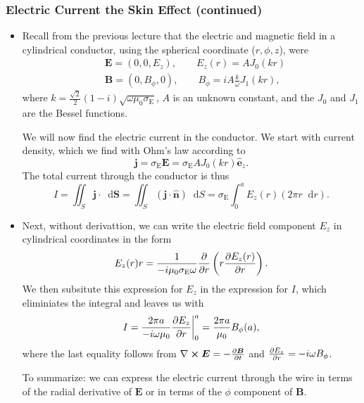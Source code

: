 \documentclass[11pt, a4paper]{article}
\newcommand{\diff}{\mathop{}\!\mathrm{d}} %
\renewcommand{\vec}[1]{\bm{#1}} %
\newcommand{\uvec}[1]{\hat{\vec{#1}}} %
\newcommand{\E}{\vec{E}} %
\newcommand{\B}{\vec{B}} %
\newcommand{\mm}{\mu_{0}}  %
\renewcommand{\j}{\vec{j}}  %
\renewcommand{\curl}{\nabla \cross}
\begin{document}
\subsubsection{Electric Current the Skin Effect (continued)}
\begin{itemize}
	\item Recall from the previous lecture that the electric and magnetic field in a cylindrical conductor, using the spherical coordinate ($ r, \phi, z $), were
	\begin{align*}
		& \E = (0, 0, E_{z}), \qquad E_{z}(r) = A J_{0}(kr) \\
		& \B = (0, B_{\phi}, 0), \qquad B_{\phi} = i A \frac{k}{\omega} J_{1}(kr),
	\end{align*}
	where $ k = \frac{\sqrt{2}}{2}(1- i)\sqrt{\omega \mm \sigma_{\text{E}}} $, $ A $ is an unknown constant, and the $ J_{0} $ and $ J_{1} $ are the Bessel functions.
	
	We will now find the electric current in the conductor. We start with current density, which we find with Ohm's law according to
	\begin{equation*}
		\j = \sigma_{\text{E}}\E = \sigma_{\text{E}}AJ_{0}(kr)\uvec{e}_{z}.
	\end{equation*}
	The total current through the conductor is thus
	\begin{equation*}
		I = \iint_{S} \j \cdot \diff \vec{S} = \iint_{S} (\j \cdot \uvec{n})\diff S = \sigma_{\text{E}} \int_{0}^{a}E_{z}(r)(2\pi r\diff r).
	\end{equation*}
	
	\item Next, without derivattion, we can write the electric field component $ E_{z} $ in cylindrical coordinates in the form
	\begin{equation*}
		E_{z}(r)r = \frac{1}{-i\mm \sigma_{\text{E}}\omega} \pdv{r}\left(r \pdv{E_{z}(r)}{r}\right).
	\end{equation*}
	We then subsitute this expression for $ E_{z} $ in the expression for $ I $, which eliminiates the integral and leaves us with
	\begin{equation*}
		I = \frac{2\pi a}{-i\omega \mm}\pdv{E_{z}}{r}\bigg |_{0}^{a} = \frac{2\pi a}{\mm}B_{\phi}(a),
	\end{equation*}
	where the last equality follows from $ \curl \E = - \pdv{\B}{t} $ and $ \pdv{E_{z}}{r} = -i \omega B_{\phi}$.
	
	To summarize: we can express the electric current through the wire in terms of the radial derivative of $ \E $ or in terms of the $ \phi $ component of $ \B $. 
	
\end{itemize}
\end{document}
